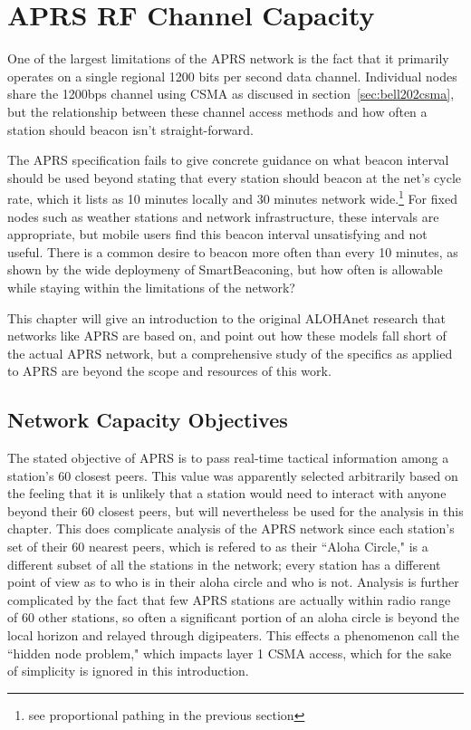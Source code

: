 \chapter{APRS RF Channel Capacity}
\label{chap:channelcapacity}

One of the largest limitations of the APRS network is the fact that it primarily operates
on a single regional 1200 bits per second data channel. 
Individual nodes share the 1200bps channel using 
CSMA as discused in section~\ref{sec:bell202csma}, but the relationship between 
these channel access methods and how often a station should beacon isn't straight-forward.

The APRS specification fails to give concrete guidance on what beacon interval should
be used beyond stating that every station should beacon at the net's cycle rate,
which it lists as 10 minutes locally and 30 minutes 
network wide\cite[p.~9]{aprsspec}.\footnote{see proportional pathing in the previous section}
For fixed nodes such as weather stations and network infrastructure, 
these intervals are appropriate, but mobile users find this beacon interval unsatisfying
and not useful.
There is a common desire to beacon more often than every 10 minutes,
as shown by the wide deploymeny of SmartBeaconing,
but how often is allowable while staying within the limitations of the network?

This chapter will give an introduction to the original ALOHAnet research that networks like
APRS are based on, and point out how these models fall short of the actual APRS network,
but a comprehensive study of the specifics as applied to APRS are beyond
the scope and resources of this work.

\section{Network Capacity Objectives}

The stated objective of APRS is to pass real-time tactical information among a station's
60 closest peers.
This value was apparently selected arbitrarily based on the feeling that
it is unlikely that a station would need to interact with anyone beyond their 60
closest peers, but will nevertheless be used for the analysis in this chapter.
This does complicate analysis of the APRS network since each station's set of
their 60 nearest peers, which is refered to as their ``Aloha Circle,"
is a different subset of all the stations in the network;
every station has a different point of view as to who is in their aloha circle and who
is not.
Analysis is further complicated by the fact that few APRS stations are actually within
radio range of 60 other stations, so often a significant portion of an aloha circle is
beyond the local horizon and relayed through digipeaters.
This effects a phenomenon call the ``hidden node problem," which impacts
layer 1 CSMA access, which for the sake of simplicity is ignored in this introduction.

